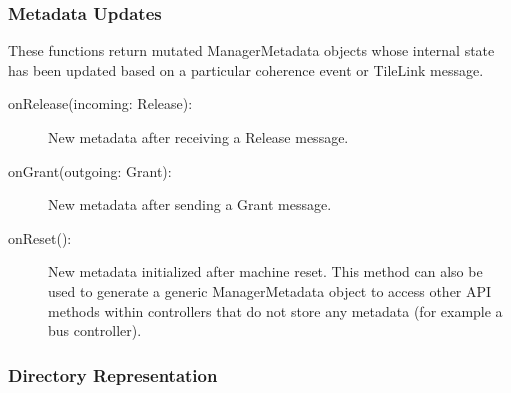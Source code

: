 \subsubsection{Metadata Updates}

These functions return mutated ManagerMetadata objects whose internal state has been updated based on a particular coherence event or TileLink message.

\begin{description}
\item[onRelease(incoming: Release):]
New metadata after receiving a Release message.
\item[onGrant(outgoing: Grant):]
New metadata after sending a Grant message.
\item[onReset():]
New metadata initialized after machine reset.
This method can also be used to generate a generic ManagerMetadata object to access other API methods
within controllers that do not store any metadata (for example a bus controller).
\end{description}

\subsubsection{Directory Representation}


